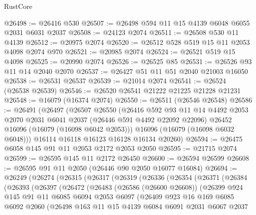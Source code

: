 \begin{lexlean}{RustCore}
\begin{coremodule}
@26498 := @26416 @530
@26507 := @26498 @594 @11 @15 @4139 @6048 @6055 @2031 @6031 @2037
@26508 := @24123 @2074
@26511 := @26508 @530 @11 @4139
@26512 := @20975 @2074
@26520 := @26512 @528 @519 @15 @11 @2053 @4098 @2074 @970
@26521 := @20985 @2074
@26524 := @26521 @519 @15 @4098
@26525 := @20990 @2074
@26526 := @26525 @85
@26531 := @26526 @93 @11 @14 @2040 @2070
@26537 := @26427 @51 @11 @51 @2040 @21003 @16050
@26538 := @26531 @26537
@26539 := @21014 @2074
@26541 := @26524 (@26538 @26539)
@26546 := @26520 @26541 @21222 @21225 @21228 @21231
@26548 := @16079 (@16374 @2074)
@26550 := @26511 (@26546 @26548)
@26586 := @26491
    (@26497
      (@26507
        @26550
        (@26416
          @592
          @93
          @11
          @14
          @4492
          @2053
          @2070
          @2031
          @6041
          @2037
          (@26446 @591 @4492 @22092 @22096)
          @26452
          @16096
          (@16079 (@16098 @6042 @2053)))
        @16096
        (@16079 (@16098 @6032 @6048)))
      @16114
      @16118
      @16123
      @16128
      @16134
      @20260)
@26594 := @26475 @6058 @145 @91 @11 @2053 @2172 @2053 @2050
@26595 := @21715 @2074
@26599 := @26595 @145 @11 @2172 @26450
@26600 := @26594 @26599
@26608 := @26595 @91 @11 @2050 (@26446 @90 @2050 @16077 @16084)
@26694 := @26249
    (@26274
      (@26315
        (@26317
          (@26319
            (@26336
              (@26354
                (@26371
                  (@26384
                    (@26393
                      (@26397
                        (@26472
                          (@26483
                            (@26586 (@26600 @26608))
                            (@26399
                              @924
                              @145
                              @91
                              @11
                              @6085
                              @6094
                              @2053
                              @6097
                              (@26409
                                @923
                                @16
                                @169
                                @6085
                                @6092
                                @2060
                                (@26498
                                  @163
                                  @11
                                  @15
                                  @4139
                                  @6084
                                  @6091
                                  @2031
                                  @6067
                                  @2037

\end{coremodule}
\end{lexlean}
